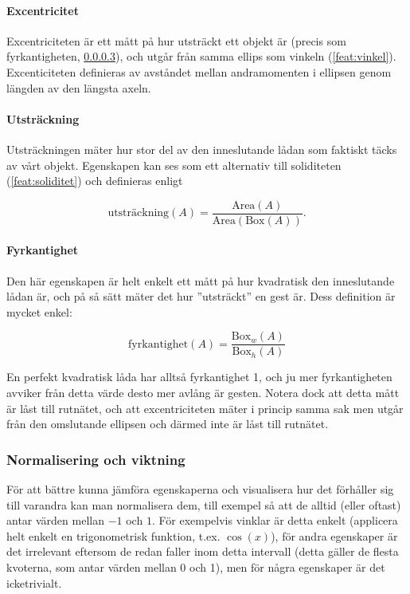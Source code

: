 \documentclass[../rapport_MVEX01-11-05]{subfiles}
\begin{document}
\paragraph{Excentricitet}

Excentriciteten är ett mått på hur utsträckt ett objekt är (precis som
fyrkantigheten, \ref{feat:fyrkantighet}), och utgår från samma ellips
som vinkeln (\ref{feat:vinkel}). Excenticiteten definieras av avståndet
mellan andramomenten i ellipsen genom längden av den längsta axeln.

\paragraph{Utsträckning}

Utsträckningen mäter hur stor del av den inneslutande lådan som
faktiskt täcks av vårt objekt. Egenskapen kan ses som ett alternativ
till soliditeten (\ref{feat:soliditet}) och definieras enligt

\begin{equation*}
  \textrm{utsträckning}(A) =
  \frac{\textrm{Area}(A)}{\textrm{Area}(\textrm{Box}(A))}.
\end{equation*}

\paragraph{Fyrkantighet}
\label{feat:fyrkantighet}

Den här egenskapen är helt enkelt ett mått på hur kvadratisk den
inneslutande lådan är, och på så sätt mäter det hur ''utsträckt'' en
gest är. Dess definition är mycket enkel:

\begin{equation*}
  \textrm{fyrkantighet}(A) = \frac{\textrm{Box}_w(A)}{\textrm{Box}_h(A)}
\end{equation*}

En perfekt kvadratisk låda har alltså fyrkantighet 1, och ju mer
fyrkantigheten avviker från detta värde desto mer avlång är gesten.
Notera dock att detta mått är låst till rutnätet, och att
excentriciteten mäter i princip samma sak men utgår från den
omslutande ellipsen och därmed inte är låst till rutnätet.

\subsubsection{Normalisering och viktning}

För att bättre kunna jämföra egenskaperna och visualisera hur det
förhåller sig till varandra kan man normalisera dem, till exempel så
att de alltid (eller oftast) antar värden mellan $-1$ och $1$. För
exempelvis vinklar är detta enkelt (applicera helt enkelt en
trigonometrisk funktion, t.ex. $\cos(x)$), för andra egenskaper är det
irrelevant eftersom de redan faller inom detta intervall (detta gäller
de flesta kvoterna, som antar värden mellan 0 och 1), men för några
egenskaper är det icketrivialt.
\end{document}
